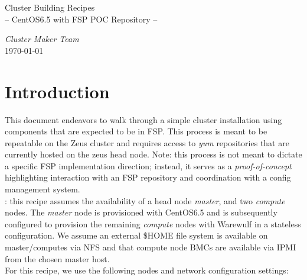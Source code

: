 \documentclass[letterpaper]{article}
\begin{document}


\begin{center}
\vspace*{-0.5cm}
{\Large Cluster Building Recipes} \\ \vspace*{0.2cm}
{\large -- CentOS6.5 with FSP POC Repository -- } \\ \vspace*{0.75cm}

{\large \em Cluster Maker Team} \\
\today
\end{center}


\section{Introduction}
This document endeavors to walk through a simple cluster installation using
components that are expected to be in FSP. This process is meant to be
repeatable on the Zeus cluster and requires access to {\em yum} repositories
that are currently hosted on the zeus head node. Note: this process is not
meant to dictate a specific FSP implementation direction; instead, it serves as a {\em
  proof-of-concept} highlighting interaction with an FSP repository and
coordination with a config management system. \\

: this recipe assumes the availability of a head node
	  {\em master}, and two {\em compute} nodes. The {\em master} node is
	  provisioned with CentOS6.5 and is subsequently configured to
	  provision the remaining {\em compute} nodes with Warewulf in a
	  stateless configuration. We assume an external \$HOME file system is
	  available on master/computes via NFS and that compute node BMCs are
	  available via IPMI from the chosen master host. \\

\noindent For this recipe, we use the following nodes and network configuration
settings:

\end{document}
